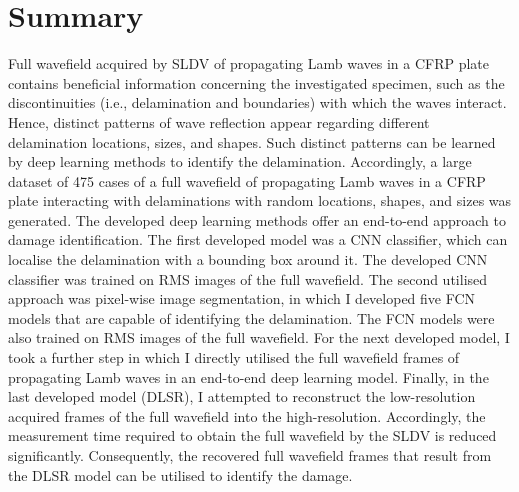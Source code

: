 \section{Summary}
\label{sec46}
Full wavefield acquired by SLDV of propagating Lamb waves in a CFRP plate contains beneficial information concerning the investigated specimen, such as the discontinuities (i.e., delamination and boundaries) with which the waves interact.
Hence, distinct patterns of wave reflection appear regarding different delamination locations, sizes, and shapes.
Such distinct patterns can be learned by deep learning methods to identify the delamination.
Accordingly, a large dataset of 475 cases of a full wavefield of propagating Lamb waves in a CFRP plate interacting with delaminations with random locations, shapes, and sizes was generated.
The developed deep learning methods offer an end-to-end approach to damage identification.
The first developed model was a CNN classifier, which can localise the delamination with a bounding box around it.
The developed CNN classifier was trained on RMS images of the full wavefield.
The second utilised approach was pixel-wise image segmentation, in which I developed five FCN models that are capable of identifying the delamination.
The FCN models were also trained on RMS images of the full wavefield.
For the next developed model, I took a further step in which I directly utilised the full wavefield frames of propagating Lamb waves in an end-to-end deep learning model. 
Finally, in the last developed model (DLSR), I attempted to reconstruct the low-resolution acquired frames of the full wavefield into the high-resolution.
Accordingly, the measurement time required to obtain the full wavefield by the SLDV is reduced significantly.
Consequently, the recovered full wavefield frames that result from the DLSR model can be utilised to identify the damage.